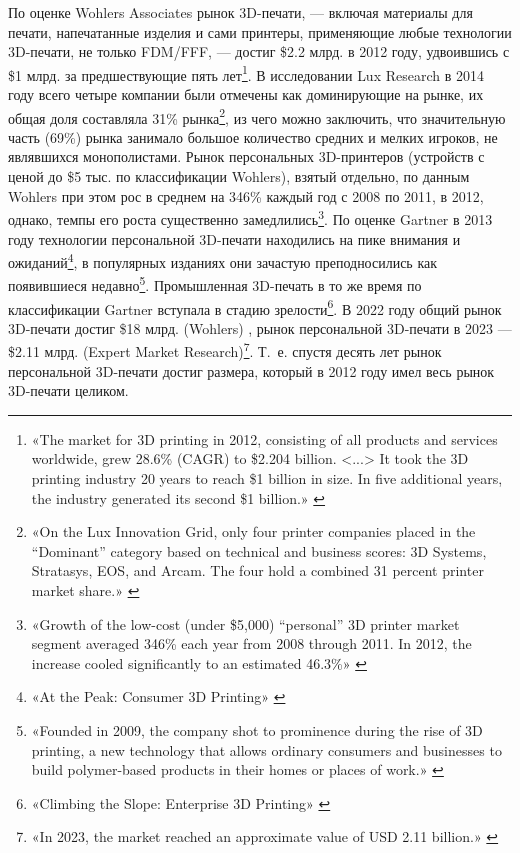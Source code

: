 \documentclass{article}
\begin{document}
По оценке Wohlers Associates рынок 3D-печати, — включая материалы для печати, напечатанные изделия и сами принтеры, применяющие любые технологии 3D-печати, не только FDM/FFF, — достиг \$2.2 млрд. в 2012 году, удвоившись с \$1 млрд. за предшествующие пять лет\footnote{«The market for 3D printing in 2012, consisting of all products and services worldwide, grew 28.6\% (CAGR) to \$2.204 billion. <...> It took the 3D printing industry 20 years to reach \$1 billion in size. In five additional years, the industry generated its second \$1 billion.» \cite{wohlersReport2013}}. В исследовании Lux Research в 2014 году всего четыре компании были отмечены как доминирующие на рынке, их общая доля составляла 31\% рынка\footnote{«On the Lux Innovation Grid, only four printer companies placed in the “Dominant” category based on technical and business scores: 3D Systems, Stratasys, EOS, and Arcam. The four hold a combined 31 percent printer market share.» \cite{luxResearchHow3dPrintingAddsUp2014}}, из чего можно заключить, что значительную часть (69\%) рынка занимало большое количество средних и мелких игроков, не являвшихся монополистами. Рынок персональных 3D-принтеров (устройств с ценой до \$5 тыс. по классификации Wohlers), взятый отдельно, по данным Wohlers при этом рос в среднем на 346\% каждый год с 2008 по 2011, в 2012, однако, темпы его роста существенно замедлились\footnote{«Growth of the low-cost (under \$5,000) “personal” 3D printer market segment averaged 346\% each year from 2008 through 2011. In 2012, the increase cooled significantly to an estimated 46.3\%» \cite{wohlersReport2013}}. По оценке Gartner в 2013 году технологии персональной 3D-печати находились на пике внимания и ожиданий\footnote{«At the Peak: Consumer 3D Printing» \cite{gartnerHype2013}}, в популярных изданиях они зачастую преподносились как появившиеся недавно\footnote{«Founded in 2009, the company shot to prominence during the rise of 3D printing, a new technology that allows ordinary consumers and businesses to build polymer-based products in their homes or places of work.» \cite{cnetMakerBot2UsSchools2013}}. Промышленная 3D-печать в то же время по классификации Gartner вступала в стадию зрелости\footnote{«Climbing the Slope: Enterprise 3D Printing» \cite{gartnerHype2013}}. В 2022 году общий рынок 3D-печати достиг \$18 млрд. (Wohlers) \cite{wohlersReport2023}, рынок персональной 3D-печати в 2023 — \$2.11 млрд. (Expert Market Research)\footnote{«In 2023, the market reached an approximate value of USD 2.11 billion.» \cite{expertMarketResearchPersonal3dp2023}}. Т.~е. спустя десять лет рынок персональной 3D-печати достиг размера, который в 2012 году имел весь рынок 3D-печати целиком.
\end{document}
